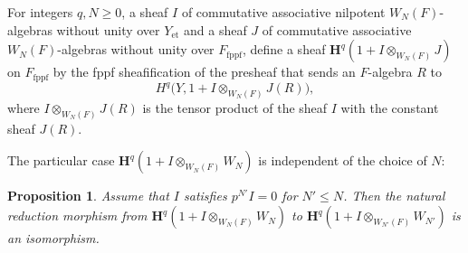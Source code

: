 \documentclass{amsart}
\newtheorem{Prop}[Thm]{Proposition}
\theoremstyle{remark}
\numberwithin{equation}{section}
\newcommand{\tensor}{\mathbin{\otimes}}
\newcommand{\et}{\mathrm{et}}
\newcommand{\fppf}{\mathrm{fppf}}
\newcommand{\alg}[1]{\mathbf{#1}}
\begin{document}
For integers $q, N \ge 0$,
a sheaf $I$ of commutative associative nilpotent $W_{N}(F)$-algebras without unity over $Y_{\et}$
and a sheaf $J$ of commutative associative $W_{N}(F)$-algebras without unity over $F_{\fppf}$,
define a sheaf $\alg{H}^{q}(1 + I \tensor_{W_{N}(F)} J)$ on $F_{\fppf}$
by the fppf sheafification of the presheaf
that sends an $F$-algebra $R$ to
	\begin{equation} \label{0060}
		H^{q} \bigl(
			Y,
			1 + I \tensor_{W_{N}(F)} J(R)
		\bigr),
	\end{equation}
where $I \tensor_{W_{N}(F)} J(R)$ is the tensor product of the sheaf $I$
with the constant sheaf $J(R)$.

The particular case
$\alg{H}^{q}(1 + I \tensor_{W_{N}(F)} W_{N})$ is independent of the choice of $N$:

\begin{Prop} \label{0063}
	Assume that $I$ satisfies $p^{N'} I = 0$ for $N' \le N$.
	Then the natural reduction morphism from
	$\alg{H}^{q}(1 + I \tensor_{W_{N}(F)} W_{N})$
	to $\alg{H}^{q}(1 + I \tensor_{W_{N'}(F)} W_{N'})$ is an isomorphism.
\end{Prop}
\end{document}
